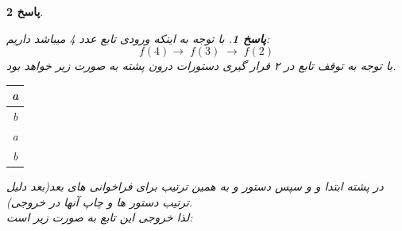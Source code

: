 \documentclass[12pt]{article}
\newtheorem{answer}{پاسخ}[section]
\begin{document}
\begin{answer}
\begin{answer}
	با توجه به اینکه ورودی تابع عدد 4 میباشد داریم:\\
	\[
	f(4) \rightarrow \; f(3) \; \rightarrow \; f(2)
	\]
با توجه به توقف تابع در ۲  قرار گیری دستورات درون پشته به صورت زیر خواهد بود.\\
\begin{center}
\begin{latin}
\begin{tabular}{|c|}
	a\\
	\hline
	b\\
	\hline
	a\\
	\hline
	b\\
	\hline
\end{tabular}
\end{latin}
\end{center}
در پشته ابتدا و  و سپس دستور  و به همین ترتیب برای  فراخوانی های بعد(بعد دلیل ترتیب دستور ها و چاپ آنها در خروجی).\\
لذا خروجی این تابع به صورت زیر است: 
\begin{center}
\end{center}
\end{answer}
\newpage


\end{answer}
\end{document}
